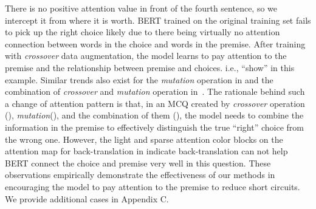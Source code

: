 There is no positive attention value in front of the fourth sentence, 
so we intercept it from where it is worth. 
BERT trained on the original training set fails 
to pick up the right choice likely due to there being 
virtually no attention connection between words in 
the choice and words in the premise.
After training with \textit{crossover} data augmentation, 
the model learns  
to pay attention to the premise and the relationship 
between premise and choices. 
i.e., ``show'' in this example. 
Similar trends also exist for the \textit{mutation} operation in  
and the combination of \textit{crossover} 
and \textit{mutation} operation in~. 
The rationale behind 
such a change of attention pattern is that, 
in an MCQ created by \textit{crossover} operation (), \textit{mutation}(), 
and the combination of them (), 
the model needs to combine the information 
in the premise to effectively 
distinguish the true ``right'' choice from the wrong one. 
However, the light and sparse attention color blocks on the attention map for back-translation 
in  indicate back-translation 
can not help BERT connect the choice and premise very well in this question.
These observations empirically demonstrate the effectiveness of our methods 
in encouraging the model to pay attention to the premise to reduce 
short circuits. We provide additional cases in Appendix C. 


